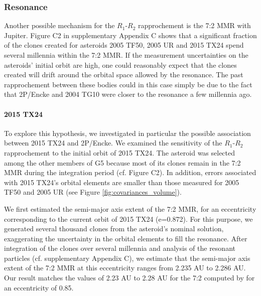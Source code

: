 \documentclass[letters,a4paper,fleqn,usenatbib]{mnras}
\begin{document}
 \subsubsection{Resonance}\label{sec:G5_resonance}
 
 Another possible mechanism for the $R_1$-$R_2$ rapprochement is the 7:2 MMR with Jupiter. Figure C2 in supplementary Appendix C shows that a significant fraction of the clones created for asteroids 2005 TF50, 2005 UR and 2015 TX24 spend several millennia within the 7:2 MMR. If the measurement uncertainties on the asteroids' initial orbit are high, one could reasonably expect that the clones created will drift around the orbital space allowed by the resonance. The past rapprochement between these bodies could in this case simply be due to the fact that 2P/Encke and 2004 TG10 were closer to the resonance a few millennia ago. 
  
  \paragraph{2015 TX24}
 
 To explore this hypothesis, we investigated in particular the possible association between 2015 TX24 and 2P/Encke. We examined the sensitivity of the $R_1$-$R_2$ rapprochement to the initial orbit of 2015 TX24. The asteroid was selected among the other members of G5 because most of its clones remain in the 7:2 MMR during the integration period (cf. Figure C2). In addition, errors associated with 2015 TX24's orbital elements are smaller than those measured for 2005 TF50 and 2005 UR (see Figure \ref{fig:covariances_volume}).
 
 We first estimated the semi-major axis extent of the 7:2 MMR, for an eccentricity corresponding to the current orbit of 2015 TX24 (e=0.872). For this purpose, we generated several thousand clones from the asteroid's nominal solution, exaggerating the uncertainty in the orbital elements to fill the resonance. After integration of the clones over several millennia and analysis of the resonant particles (cf. supplementary Appendix C), we estimate that the semi-major axis extent of the 7:2 MMR at this eccentricity ranges from 2.235 AU to 2.286 AU. Our result matches the values of 2.23 AU to 2.28 AU for the 7:2 computed by \cite{Asher1991} for an eccentricity of 0.85.   
 
\end{document}
